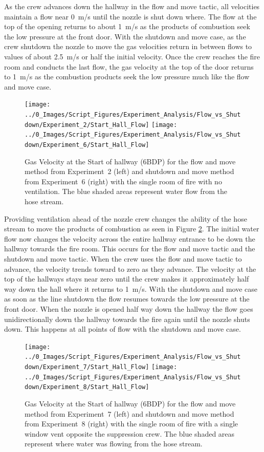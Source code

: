 \documentclass[12pt,oneside]{book}
\begin{document}
As the crew advances down the hallway in the flow and move tactic, all velocities maintain a flow near 0~m/s until the nozzle is shut down where. The flow at the top of the opening returns to about 1~m/s as the products of combustion seek the low pressure at the front door.  With the shutdown and move case, as the crew shutdown the nozzle to move the gas velocities return in between flows to values of about 2.5~m/s or half the initial velocity. Once the crew reaches the fire room and conducts the last flow, the gas velocity at the top of the door returns to 1~m/s as the combustion products seek the low pressure much like the flow and move case.

\begin{figure}[H]
\centering
\texttt{[image: ../0\_Images/Script\_Figures/Experiment\_Analysis/Flow\_vs\_Shutdown/Experiment\_2/Start\_Hall\_Flow]}
\texttt{[image: ../0\_Images/Script\_Figures/Experiment\_Analysis/Flow\_vs\_Shutdown/Experiment\_6/Start\_Hall\_Flow]}
\caption[Airflow - No Vent - Flow \& Move vs. Shutdown \& Move]{Gas Velocity at the Start of hallway (6BDP) for the flow and move method from Experiment~2 (left) and shutdown and move method from Experiment~6 (right) with the single room of fire with no ventilation. The blue shaded areas represent water flow from the hose stream.}
\label{fig:Flow_vs_Shut_Single_No_Vent_Velocity}
\end{figure}

Providing ventilation ahead of the nozzle crew changes the ability of the hose stream to move the products of combustion as seen in Figure \ref{fig:Flow_vs_Shut_Single_Vent_Velocity}. The initial water flow now changes the velocity across the entire hallway entrance to be down the hallway towards the fire room. This occurs for the flow and move tactic and the shutdown and move tactic. When the crew uses the flow and move tactic to advance, the velocity trends toward to zero as they advance. The velocity at the top of the hallways stays near zero until the crew makes it approximately half way down the hall where it returns to 1~m/s. With the shutdown and move case as soon as the line shutdown the flow resumes towards the low pressure at the front door. When the nozzle is opened half way down the hallway the flow goes unidirectionally down the hallway towards the fire again until the nozzle shuts down. This happens at all points of flow with the shutdown and move case.

\begin{figure}[H]
\centering
\texttt{[image: ../0\_Images/Script\_Figures/Experiment\_Analysis/Flow\_vs\_Shutdown/Experiment\_7/Start\_Hall\_Flow]}
\texttt{[image: ../0\_Images/Script\_Figures/Experiment\_Analysis/Flow\_vs\_Shutdown/Experiment\_8/Start\_Hall\_Flow]}
\caption[Airflow - Single Vent - Flow \& Move vs. Shutdown \& Move]{Gas Velocity at the Start of hallway (6BDP) for the flow and move method from Experiment~7 (left) and shutdown and move method from Experiment~8 (right) with the single room of fire with a single window vent opposite the suppression crew. The blue shaded areas represent where water was flowing from the hose stream.}
\label{fig:Flow_vs_Shut_Single_Vent_Velocity}
\end{figure}
\end{document}
